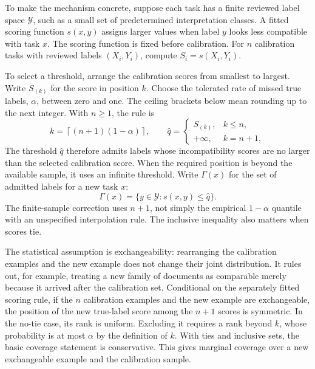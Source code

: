 \documentclass[12pt,a4paper,oneside,openany]{book}
\begin{document}
To make the mechanism concrete, suppose each task has a finite reviewed label
space $\mathcal Y$, such as a small set of predetermined interpretation classes.
A fitted scoring function $s(x,y)$ assigns larger values when label $y$ looks less
compatible with task $x$. The scoring function is fixed before calibration.
For $n$ calibration tasks with reviewed labels $(X_i,Y_i)$, compute
$S_i=s(X_i,Y_i)$.

To select a threshold, arrange the calibration scores from smallest to largest.
Write $S_{(k)}$ for the score in position $k$. Choose the tolerated rate of missed
true labels, $\alpha$, between zero and one. The ceiling brackets below mean
rounding up to the next integer. With $n\geq1$, the rule is
\begin{equation}
 k=\left\lceil(n+1)(1-\alpha)\right\rceil,
 \qquad
 \widehat q=\begin{cases}
 S_{(k)},&k\leq n,\\
 +\infty,&k=n+1,
 \end{cases}
 \label{eq:conformal-quantile}
\end{equation}
The threshold $\widehat q$ therefore admits labels whose incompatibility scores
are no larger than the selected calibration score. When the required position is
beyond the available sample, it uses an infinite threshold. Write $\Gamma(x)$
for the set of admitted labels for a new task $x$:
\begin{equation}
 \Gamma(x)=\{y\in\mathcal Y:s(x,y)\leq\widehat q\}.
 \label{eq:conformal-set}
\end{equation}
The finite-sample correction uses $n+1$, not simply the empirical $1-\alpha$
quantile with an unspecified interpolation rule. The inclusive inequality also
matters when scores tie.

The statistical assumption is exchangeability: rearranging the calibration
examples and the new example does not change their joint distribution. It rules
out, for example, treating a new family of documents as comparable merely because
it arrived after the calibration set. Conditional on the separately fitted scoring rule, if the
$n$ calibration examples and the new example are exchangeable, the position of
the new true-label score among the $n+1$ scores is symmetric. In the no-tie case,
its rank is uniform. Excluding it requires a rank beyond $k$, whose probability
is at most $\alpha$ by the definition of $k$. With ties and inclusive sets, the
basic coverage statement is conservative. This gives marginal coverage over a
new exchangeable example and the calibration sample.
\end{document}
